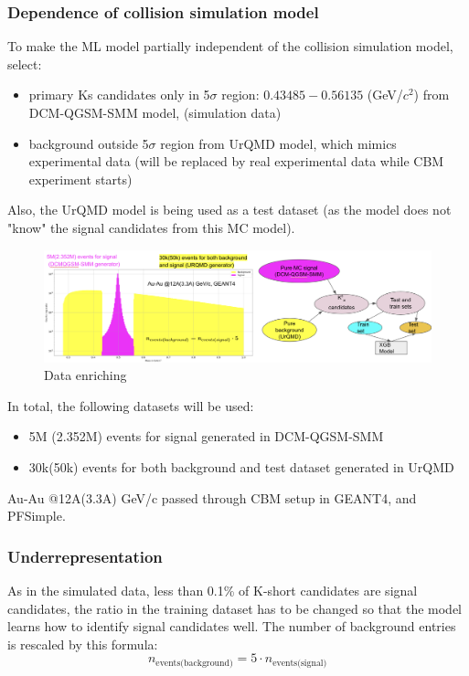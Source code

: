 \subsubsection{Dependence of collision simulation model}
To make the ML model partially independent of the collision simulation model,  select:
\begin{itemize}
    \item primary Ks candidates only in 5$\sigma$ region: $0.43485 - 0.56135$ (GeV/$c^2$) from DCM-QGSM-SMM model, (simulation data)
    \item background outside 5$\sigma$ region from UrQMD model, which mimics experimental data (will be replaced by real experimental data while CBM experiment starts)
\end{itemize}
Also, the UrQMD model is being used as a test dataset (as the model does not "know" the signal candidates from this MC model).
\begin{figure}[H]
    \centering
    \includegraphics[width=1\textwidth]{img/dataset.png}
    \caption{Data enriching}
\end{figure}
In total, the following datasets will be used:
\begin{itemize}
    \item 5M (2.352M) events for signal generated in DCM-QGSM-SMM
    \item 30k(50k) events for both background and test dataset generated in UrQMD
\end{itemize}
Au-Au @12A(3.3A) GeV/c passed through CBM setup in GEANT4, and PFSimple.


\subsubsection{Underrepresentation}
As in the simulated data, less than 0.1\% of K-short candidates are signal candidates, the ratio in the training dataset has to be changed so that the model learns how to identify signal candidates well. The number of background entries is rescaled by this formula:
\begin{equation}
    n_\text{events(background)} = 5 \cdot n_\text{events(signal)}
\end{equation}


